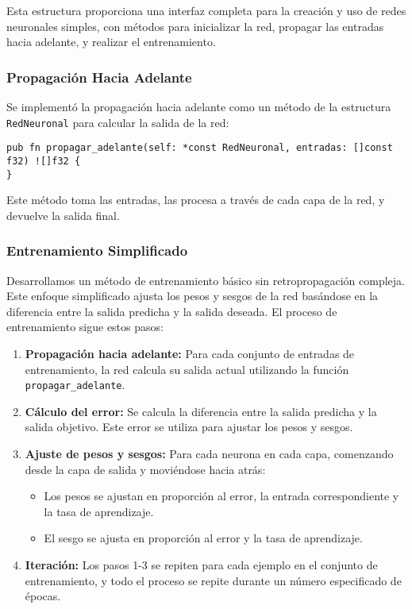 \documentclass[twocolumn]{article}
\begin{document}
Esta estructura proporciona una interfaz completa para la creación y uso de redes neuronales simples, con métodos para inicializar la red, propagar las entradas hacia adelante, y realizar el entrenamiento.

\subsubsection{Propagación Hacia Adelante}
Se implementó la propagación hacia adelante como un método de la estructura \texttt{RedNeuronal} para calcular la salida de la red:

\begin{lstlisting}[style=customcode]
pub fn propagar_adelante(self: *const RedNeuronal, entradas: []const f32) ![]f32 {
}
\end{lstlisting}

Este método toma las entradas, las procesa a través de cada capa de la red, y devuelve la salida final.

\subsubsection{Entrenamiento Simplificado}
Desarrollamos un método de entrenamiento básico sin retropropagación compleja. Este enfoque simplificado ajusta los pesos y sesgos de la red basándose en la diferencia entre la salida predicha y la salida deseada. El proceso de entrenamiento sigue estos pasos:

\begin{enumerate}
    \item \textbf{Propagación hacia adelante:} Para cada conjunto de entradas de entrenamiento, la red calcula su salida actual utilizando la función \texttt{propagar\_adelante}.

    \item \textbf{Cálculo del error:} Se calcula la diferencia entre la salida predicha y la salida objetivo. Este error se utiliza para ajustar los pesos y sesgos.

    \item \textbf{Ajuste de pesos y sesgos:} Para cada neurona en cada capa, comenzando desde la capa de salida y moviéndose hacia atrás:
    \begin{itemize}
        \item Los pesos se ajustan en proporción al error, la entrada correspondiente y la tasa de aprendizaje.
        \item El sesgo se ajusta en proporción al error y la tasa de aprendizaje.
    \end{itemize}

    \item \textbf{Iteración:} Los pasos 1-3 se repiten para cada ejemplo en el conjunto de entrenamiento, y todo el proceso se repite durante un número especificado de épocas.
\end{enumerate}
\end{document}
